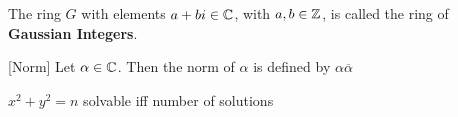 \documentclass{memoir}
\begin{document}
\begin{defn}
	The ring \(G\) with elements \(a+bi \in \mathbb{C}\), with \(a,b \in \mathbb{Z}\), is called the ring of \textbf{Gaussian Integers}.
\end{defn}[Norm]
Let \(\alpha \in \mathbb{C}\). Then the norm of \(\alpha\) is defined by \(\alpha \overline{\alpha}\)
\begin{thm}
	\(x^2+y^2 = n\) solvable iff number of solutions
\end{thm}
\end{document}
